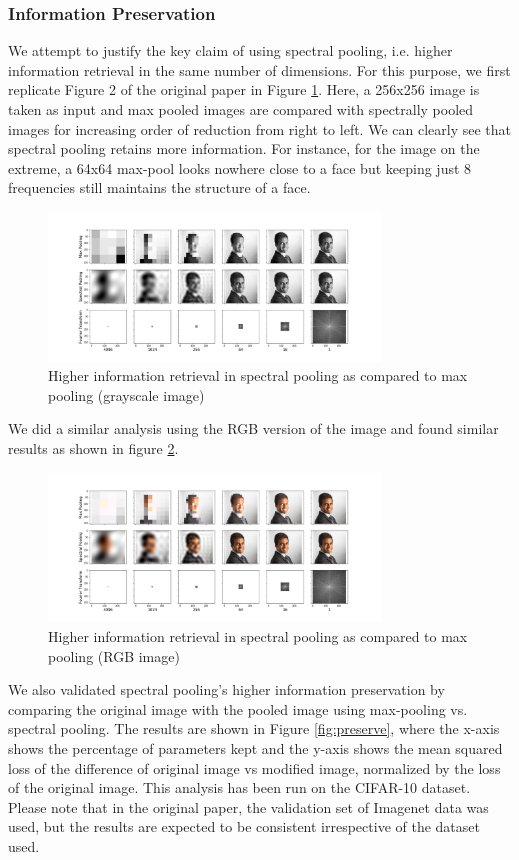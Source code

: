 \documentclass[10pt,journal,compsoc]{IEEEtran}
\begin{document}
\subsubsection{Information Preservation}
We attempt to justify the key claim of using spectral pooling, i.e. higher information retrieval in the same number of dimensions. For this purpose, we first replicate Figure 2 of the original paper in Figure \ref{fig:fig2_gray}. Here, a 256x256 image is taken as input and max pooled images are compared with spectrally pooled images for increasing order of reduction from right to left. We can clearly see that spectral pooling retains more information. For instance, for the image on the extreme, a 64x64 max-pool looks nowhere close to a face but keeping just 8 frequencies still maintains the structure of a face.

\begin{figure}[ht]
\centering
  \includegraphics[width=250pt]{images/Figure2_Grayscale_Grid_Pooling.png}
  \caption{Higher information retrieval in spectral pooling as compared to max pooling (grayscale image)}
  \label{fig:fig2_gray}
\end{figure}

We did a similar analysis using the RGB version of the image and found similar results as shown in figure \ref{fig:fig2_color}.

\begin{figure}[ht]
\centering
  \includegraphics[width=250pt]{images/Figure2_RGB_Grid_Pooling.png}
  \caption{Higher information retrieval in spectral pooling as compared to max pooling (RGB image)}
  \label{fig:fig2_color}
\end{figure}

We also validated spectral pooling's higher information preservation by comparing the original image with the pooled image using max-pooling vs. spectral pooling. The results are shown in Figure \ref{fig:preserve}, where the x-axis shows the percentage of parameters kept and the y-axis shows the mean squared loss of the difference of original image vs modified image, normalized by the loss of the original image. This analysis has been run on the CIFAR-10 dataset. Please note that in the original paper, the validation set of Imagenet data was used, but the results are expected to be consistent irrespective of the dataset used.
\end{document}
